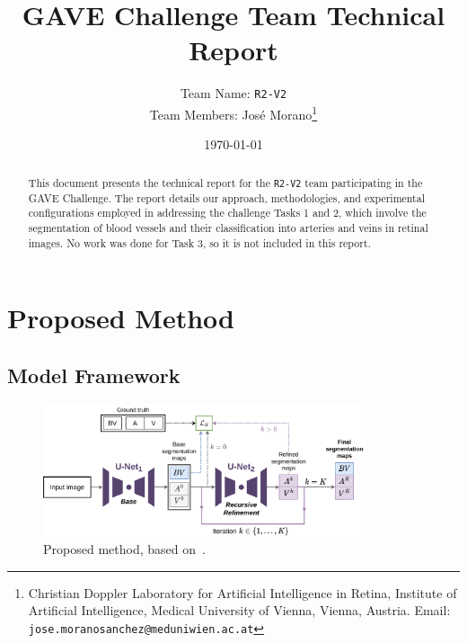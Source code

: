 \documentclass{article}
\begin{document}
\title{\bfseries GAVE Challenge Team Technical Report}
\author{%
    Team Name: \texttt{R2-V2} \\
    Team Members: José Morano\thanks{%
        Christian Doppler Laboratory for Artificial Intelligence in Retina, Institute of Artificial Intelligence, Medical University of Vienna, Vienna, Austria. Email: \texttt{jose.moranosanchez@meduniwien.ac.at}%
    }
}
 \date{\today}
\maketitle

\begin{abstract}
    This document presents the technical report for the \texttt{R2-V2} team participating in the \gls{GAVE} Challenge.
    The report details our approach, methodologies, and experimental configurations employed in addressing the challenge Tasks 1 and 2, which involve the segmentation of blood vessels and their classification into arteries and veins in retinal images.
    No work was done for Task 3, so it is not included in this report.
\end{abstract}

\section{Proposed Method}


\subsection{Model Framework}

\begin{figure}[h]
    \centering
    \includegraphics[width=0.85\textwidth]{figs/method.pdf}
    \caption{Proposed method, based on~\cite{morano2024rrwnet}.}
    \label{fig:rrwnet_architecture}
\end{figure}
\end{document}
